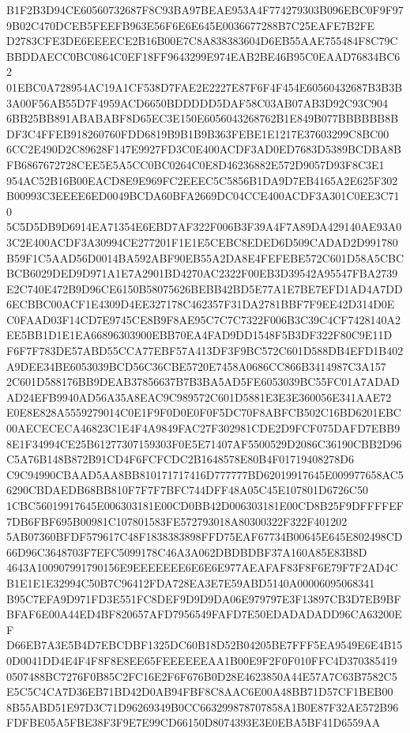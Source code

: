 \documentclass[UTF8,fontset=fandol,zihao=-4,a4paper]{ctexart}
\begin{document}
{{B1F2B3D94CE60560732687F8C93BA97BEAE953A4F774279303B096EBC0F9F979B02C470DCEB5FEEFB963E56F6E6E645E0036677288B7C25EAFE7B2FE
D2783CFE3DE6EEEECE2B16B00E7C8A838383604D6EB55AAE755484F8C79CBBDDAECC0BC0864C0EF18FF9643299E974EAB2BE46B95C0EAAD76834BC62
01EBC0A728954AC19A1CF538D7FAE2E2227E87F6F4F454E60560432687B3B3B3A00F56AB55D7F4959ACD6650BDDDDD5DAF58C03AB07AB3D92C93C904
6BB25BB891ABABABF8D65EC3E150E6056043268762B1E849B077BBBBBB8BDF3C4FFEB918260760FDD6819B9B1B9B363FEBE1E1217E37603299C8BC00
6CC2E490D2C89628F147E9927FD3C0E400ACDF3AD0ED7683D5389BCDBA8BFB6867672728CEE5E5A5CC0BC0264C0E8D46236882E572D9057D93F8C3E1
954AC52B16B00EACD8E9E969FC2EEEC5C5856B1DA9D7EB4165A2E625F302B00993C3EEEE6ED0049BCDA60BFA2669DC04CCE400ACDF3A301C0EE3C710
5C5D5DB9D6914EA71354E6EBD7AF322F006B3F39A4F7A89DA429140AE93A03C2E400ACDF3A30994CE277201F1E1E5CEBC8EDED6D509CADAD2D991780
B59F1C5AAD56D0014BA592ABF90EB55A2DA8E4FEFEBE572C601D58A5CBCBCB6029DED9D971A1E7A2901BD4270AC2322F00EB3D39542A95547FBA2739
E2C740E472B9D96CE6150B58075626BEBB42BD5E77A1E7BE7EFD1AD4A7DD6ECBBC00ACF1E4309D4EE327178C462357F31DA2781BBF7F9EE42D314D0E
C0FAAD03F14CD7E9745CE8B9F8AE95C7C7C7322F006B3C39C4CF7428140A2EE5BB1D1E1EA66896303900EBB70EA4FAD9DD1548F5B3DF322F80C9E11D
F6F7F783DE57ABD55CCA77EBF57A413DF3F9BC572C601D588DB4EFD1B402A9DEE34BE6053039BCD56C36CBE5720E7458A0686CC866B3414987C3A157
2C601D588176BB9DEAB37856637B7B3BA5AD5FE6053039BC55FC01A7ADADAD24EFB9940AD56A35A8EAC9C989572C601D5881E3E3E360056E341AAE72
E0E8E828A5559279014C0E1F9F0D0E0F0F5DC70F8ABFCB502C16BD6201EBC00AECECECA46823C1E4F4A9849FAC27F302981CDE2D9FCF075DAFD7EBB9
8E1F34994CE25B61277307159303F0E5E71407AF5500529D2086C36190CBB2D96C5A76B148B872B91CD4F6FCFCDC2B1648578E80B4F01719408278D6
C9C94990CBAAD5AA8BB810171717416D777777BD62019917645E009977658AC56290CBDAEDB68BB810F7F7F7BFC744DFF48A05C45E107801D6726C50
1CBC56019917645E006303181E00CD0BB42D006303181E00CD8B25F9DFFFFEF7DB6FBF695B00981C107801583FE572793018A80300322F322F401202
5AB07360BFDF579617C48F1838383898FFD75EAF67734B00645E645E802498CD66D96C3648703F7EFC5099178C46A3A062DBDBDBF37A160A85E83B8D
4643A100907991790156E9EEEEEEE6E6E6E977AEAFAF83F8F6E79F7F2AD4CB1E1E1E32994C50B7C96412FDA728EA3E7E59ABD5140A00006095068341
B95C7EFA9D971FD3E551FC8DEF9D9D9DA06E979797E3F13897CB3D7EB9BFBFAF6E00A44ED4BF820657AFD7956549FAFD7E50EDADADADD96CA63200EF
D66EB7A3E5B4D7EBCDBF1325DC60B18D52B04205BE7FFF5EA9549E6E4B150D0041DD4E4F4F8F8E8EE65FEEEEEEAA1B00E9F2F0F010FFC4D370385419
0507488BC7276F0B85C2FC16E2F6F676B0D28E4623850A44E57A7C63B7582C5E5C5C4CA7D36EB71BD42D0AB94FBF8C8AAC6E00A48BB71D57CF1BEB00
8B55ABD51E97D3C71D96269349B0CC663299878707858A1B0E87F32AE572B96FDFBE05A5FBE38F3F9E7E99CD66150D8074393E3E0EBA5BF41D6559AA
}}
\end{document}
